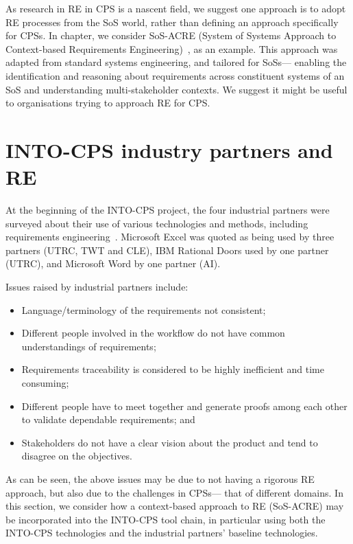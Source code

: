 As research in RE in CPS is a nascent field, we suggest one approach is to adopt RE processes from the SoS world, rather than defining an approach specifically for CPSs.  In chapter, we consider SoS-ACRE (System of Systems Approach to Context-based Requirements Engineering)~\cite{Holt&15}, as an example. This approach was adapted from standard systems engineering, and tailored for SoSs--- enabling the identification and reasoning about requirements across constituent systems of an SoS and understanding multi-stakeholder contexts. We suggest it might be useful to organisations trying to approach RE for CPS.

\section*{INTO-CPS industry partners and RE}

At the beginning of the INTO-CPS project, the four industrial partners were surveyed about their use of various technologies and methods, including requirements engineering~\cite{INTOCPSD31b}. Microsoft Excel was quoted as being used by three partners (UTRC, TWT and CLE), IBM Rational Doors used by one partner (UTRC), and Microsoft Word by one partner (AI).

Issues raised by industrial partners include:
\begin{itemize}
  \item Language/terminology of the requirements not consistent;
  \item Different people involved in the workflow do not have common understandings of requirements;
  \item Requirements traceability is considered to be highly inefficient and time consuming;
  \item Different people have to meet together and generate proofs among each other to validate dependable requirements; and
  \item Stakeholders do not have a clear vision about the product and tend to disagree on the objectives.
\end{itemize}

As can be seen, the above issues may be due to not having a rigorous RE approach, but also due to the challenges in CPSs--- that of different domains. In this section, we consider how a context-based approach to RE (SoS-ACRE) may be incorporated into the INTO-CPS tool chain, in particular using both the INTO-CPS technologies and the industrial partners' baseline technologies.

